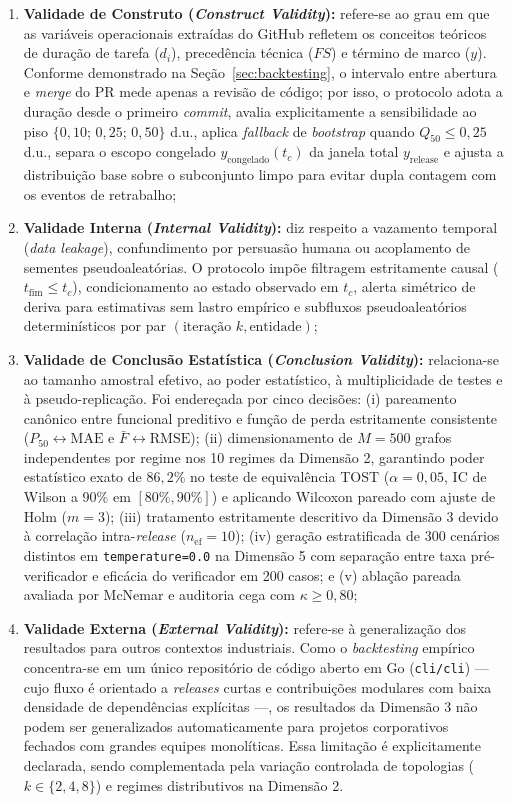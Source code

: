 \documentclass[12pt,openany,oneside,a4paper,english,brazilian,sumario=tradicional]{abntex2}
\begin{document}
\begin{enumerate}
  \item \textbf{Validade de Construto (\textit{Construct Validity}):} refere-se ao grau em que as variáveis operacionais extraídas do GitHub refletem os conceitos teóricos de duração de tarefa ($d_i$), precedência técnica ($FS$) e término de marco ($y$). Conforme demonstrado na Seção~\ref{sec:backtesting}, o intervalo entre abertura e \textit{merge} do PR mede apenas a revisão de código; por isso, o protocolo adota a duração desde o primeiro \textit{commit}, avalia explicitamente a sensibilidade ao piso $\{0{,}10;\,0{,}25;\,0{,}50\}$ d.u., aplica \textit{fallback} de \textit{bootstrap} quando $Q_{50} \le 0{,}25$ d.u., separa o escopo congelado $y_{\mathrm{congelado}}(t_c)$ da janela total $y_{\mathrm{release}}$ e ajusta a distribuição base sobre o subconjunto limpo para evitar dupla contagem com os eventos de retrabalho;
  \item \textbf{Validade Interna (\textit{Internal Validity}):} diz respeito a vazamento temporal (\textit{data leakage}), confundimento por persuasão humana ou acoplamento de sementes pseudoaleatórias. O protocolo impõe filtragem estritamente causal ($t_{\mathrm{fim}} \le t_c$), condicionamento ao estado observado em $t_c$, alerta simétrico de deriva para estimativas sem lastro empírico e subfluxos pseudoaleatórios determinísticos por par $(\text{iteração } k, \text{entidade})$;
  \item \textbf{Validade de Conclusão Estatística (\textit{Conclusion Validity}):} relaciona-se ao tamanho amostral efetivo, ao poder estatístico, à multiplicidade de testes e à pseudo-replicação. Foi endereçada por cinco decisões: (i) pareamento canônico entre funcional preditivo e função de perda estritamente consistente \cite{gneiting2011} ($P_{50} \leftrightarrow \mathrm{MAE}$ e $\bar{F} \leftrightarrow \mathrm{RMSE}$); (ii) dimensionamento de $M=500$ grafos independentes por regime nos 10 regimes da Dimensão 2, garantindo poder estatístico exato de $86{,}2\%$ no teste de equivalência TOST ($\alpha=0{,}05$, IC de Wilson a 90\% em $[80\%,90\%]$) e aplicando Wilcoxon pareado com ajuste de Holm ($m=3$); (iii) tratamento estritamente descritivo da Dimensão 3 devido à correlação intra-\textit{release} ($n_{\mathrm{ef}}=10$); (iv) geração estratificada de 300 cenários distintos em \texttt{temperature=0.0} na Dimensão 5 com separação entre taxa pré-verificador e eficácia do verificador em 200 casos; e (v) ablação pareada avaliada por McNemar e auditoria cega com $\kappa \ge 0{,}80$;
  \item \textbf{Validade Externa (\textit{External Validity}):} refere-se à generalização dos resultados para outros contextos industriais. Como o \textit{backtesting} empírico concentra-se em um único repositório de código aberto em Go (\texttt{cli/cli}) — cujo fluxo é orientado a \textit{releases} curtas e contribuições modulares com baixa densidade de dependências explícitas —, os resultados da Dimensão 3 não podem ser generalizados automaticamente para projetos corporativos fechados com grandes equipes monolíticas. Essa limitação é explicitamente declarada, sendo complementada pela variação controlada de topologias ($k \in \{2,4,8\}$) e regimes distributivos na Dimensão 2.

\end{enumerate}
\end{document}
